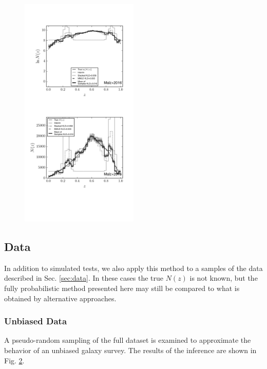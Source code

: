 \documentclass[preprint]{aastex}
\begin{document}
\begin{figure}
\includegraphics[width=0.5\textwidth]{figs/bint/comps.pdf}
\caption{}
\label{fig:intb-comp}
\end{figure}

\clearpage
\subsection{Data}
\label{sec:boss}

In addition to simulated tests, we also apply this method to a samples of the 
data described in Sec. \ref{sec:data}.  In these cases the true $N(z)$ is not 
known, but the fully probabilistic method presented here may still be compared 
to what is obtained by alternative approaches.

\subsubsection{Unbiased Data}
\label{sec:unbiased}

A pseudo-random sampling of the full dataset is examined to approximate the 
behavior of an unbiased galaxy survey.  The results of the inference are shown 
in Fig. \ref{fig:dataparam}.

\begin{figure}
\caption{}
\label{fig:dataparam}
\end{figure}
\end{document}
